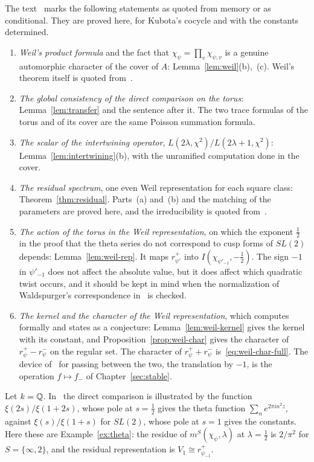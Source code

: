 \medskip
The text~\cite{JC26} marks the following statements as quoted from memory
or as conditional. They are proved here, for Kubota's cocycle and with
the constants determined.
\begin{enumerate}[label=(\roman*)]
\item \emph{Weil's product formula} and the fact that
  $\chi_\psi=\prod_v\chi_{\psi,v}$ is a genuine automorphic character of
  the cover of $A$: Lemma~\ref{lem:weil}(b),~(c). Weil's theorem itself
  is quoted from~\cite{We64}.
\item \emph{The global consistency of the direct comparison on the
  torus}: Lemma~\ref{lem:transfer} and the sentence after it. The two
  trace formulas of the torus and of its cover are the same Poisson
  summation formula.
\item \emph{The scalar of the intertwining operator},
  $L(2\lambda,\chi^2)/L(2\lambda+1,\chi^2)$:
  Lemma~\ref{lem:intertwining}(b), with the unramified computation done
  in the cover.
\item \emph{The residual spectrum}, one even Weil representation for each
  square class: Theorem~\ref{thm:residual}. Parts~(a) and~(b) and the
  matching of the parameters are proved here, and the irreducibility is
  quoted from~\cite{Ge76,GPS80,Wa80}.
\item \emph{The action of the torus in the Weil representation}, on which
  the exponent $\frac12$ in the proof that the theta series do not
  correspond to cusp forms of $SL(2)$ depends:
  Lemma~\ref{lem:weil-rep}. It maps $r^+_{\psi'}$ into
  $I(\chi_{\psi'_{-1}},-\frac12)$. The sign $-1$ in $\psi'_{-1}$ does
  not affect the absolute value, but it does affect which quadratic twist
  occurs, and it should be kept in mind when the normalization of
  Waldspurger's correspondence in~\cite{JC26} is checked.
\item \emph{The kernel and the character of the Weil representation},
  which \cite{JC26} computes formally and states as a conjecture:
  Lemma~\ref{lem:weil-kernel} gives the kernel with its constant, and
  Proposition~\ref{prop:weil-char} gives the character of
  $r^+_\psi-r^-_\psi$ on the regular set. The character of
  $r^+_\psi+r^-_\psi$ is~\eqref{eq:weil-char-full}. The device
  of~\cite{JC26} for passing between the two, the translation by $-1$, is
  the operation $f\mapsto f_-$ of Chapter~\ref{sec:stable}.
\end{enumerate}

\begin{example}\label{ex:dictionary}
Let $k=\mathbb{Q}$. In~\cite{JC26} the direct comparison is illustrated by the
function $\xi(2s)/\xi(1+2s)$, whose pole at $s=\frac12$ gives the theta
function $\sum_ne^{2\pi in^2z}$, against $\xi(s)/\xi(1+s)$ for $SL(2)$,
whose pole at $s=1$ gives the constants. Here these are
Example~\ref{ex:theta}: the residue of $m^S(\chi_\psi,\lambda)$ at
$\lambda=\frac12$ is $2/\pi^2$ for $S=\{\infty,2\}$, and the residual
representation is $V_1\cong r^+_{\psi_{-1}}$.
\end{example}

